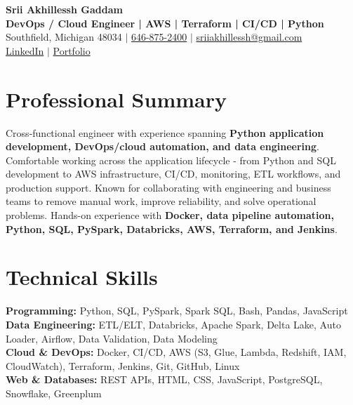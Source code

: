 \documentclass[letterpaper,10pt]{article}
\begin{document}
\fontsize{9.35pt}{10.45pt}\selectfont

\begin{center}
    {\LARGE \textbf{Srii Akhillessh Gaddam}} \\[-1pt]
    \textbf{DevOps / Cloud Engineer | AWS | Terraform | CI/CD | Python} \\[2pt]
    Southfield, Michigan 48034 $|$
    \href{tel:6468752400}{646-875-2400} $|$
    \href{mailto:sriiakhillessh@gmail.com}{sriiakhillessh@gmail.com} \\[1pt]
    \href{https://www.linkedin.com/in/srii-akhiilessh-gaddam-b48668191/}{LinkedIn} $|$
    \href{https://sriiakhillesshg.github.io/portfolio/}{Portfolio}
\end{center}
\vspace{-8pt}

\section{Professional Summary}
\small{Cross-functional engineer with experience spanning \textbf{Python application development, DevOps/cloud automation, and data engineering}. Comfortable working across the application lifecycle - from Python and SQL development to AWS infrastructure, CI/CD, monitoring, ETL workflows, and production support. Known for collaborating with engineering and business teams to remove manual work, improve reliability, and solve operational problems. Hands-on experience with \textbf{Docker, data pipeline automation, Python, SQL, PySpark, Databricks, AWS, Terraform, and Jenkins}.}

\section{Technical Skills}
\small{
\textbf{Programming:} Python, SQL, PySpark, Spark SQL, Bash, Pandas, JavaScript \\
\textbf{Data Engineering:} ETL/ELT, Databricks, Apache Spark, Delta Lake, Auto Loader, Airflow, Data Validation, Data Modeling \\
\textbf{Cloud \& DevOps:} Docker, CI/CD, AWS (S3, Glue, Lambda, Redshift, IAM, CloudWatch), Terraform, Jenkins, Git, GitHub, Linux \\
\textbf{Web \& Databases:} REST APIs, HTML, CSS, JavaScript, PostgreSQL, Snowflake, Greenplum
}
\end{document}

